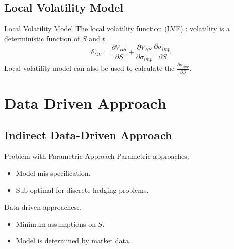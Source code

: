 \documentclass[10pt,table,mathserif]{beamer}
\begin{document}
\subsection{Local Volatility Model}
\begin{frame}{Local Volatility Model}
The local volatility function (LVF) \footnotemark : volatility is a deterministic function of $S$ and $t$.
 \[
\delta_{MV}=\frac{\partial V_{BS}}{\partial S}+\frac{\partial V_{BS}}{\partial \sigma_{imp}}\frac{\partial \sigma_{imp}}{ \partial S}
\]
Local volatility model can also be used to calculate the $\frac{\partial \sigma_{imp}}{ \partial S}$.


\end{frame}
\section{Data Driven Approach}
\subsection{Indirect Data-Driven Approach}
\begin{frame}{Problem with Parametric Approach}
Parametric approaches:
\begin{itemize}
  \item Model mis-specification.
  \item Sub-optimal for discrete hedging problems.
\end{itemize}

Data-driven approaches:.
\begin{itemize}
  \item Minimum assumptions on $S$.
  \item Model is determined by market data.
\end{itemize}


\end{frame}
\end{document}

